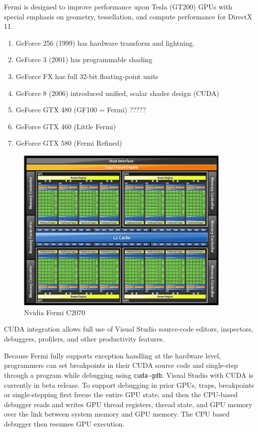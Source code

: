 Fermi is designed to improve performance upon Tesla (GT200) GPUs with special
emphasis on geometry, tessellation, and compute performance for DirectX 11.
\begin{enumerate}
  \item GeForce 256 (1999) has hardware transform and lightning.
  \item GeForce 3 (2001) has programmable shading
  \item GeForce FX has full 32-bit floating-point units
  \item GeForce 8 (2006) introduced unified, scalar shader design (CUDA)
  \item GeForce GTX 480 (GF100 = Fermi) ?????
  \item GeForce GTX 460 (Little Fermi)
  \item GeForce GTX 580 (Fermi Refined)
\end{enumerate}
 
\begin{figure}[hbt]
  \centerline{\includegraphics[height=8cm,
    angle=0]{./images/Fermi_C2070.eps}}
  \caption{Nvidia Fermi C2070}
  \label{fig:Fermi_C2070}
\end{figure}


CUDA integration allows full use of Visual Studio source-code
editors, inspectors, debuggers, profilers, and other productivity
features.  

Because Fermi fully supports exception handling at the hardware level,
programmers can set breakpoints in their CUDA source code and single-step
through a program while debugging using \verb!cuda-gdb!.  Visual Studio with
CUDA is currently in beta release.  To support debugging in prior GPUs, traps,
breakpoints or single-stepping first freeze the entire GPU state, and then the
CPU-based debugger reads and writes GPU thread registers, thread state, and GPU
memory over the link between system memory and GPU memory. The CPU based
debugger then resumes GPU execution.


